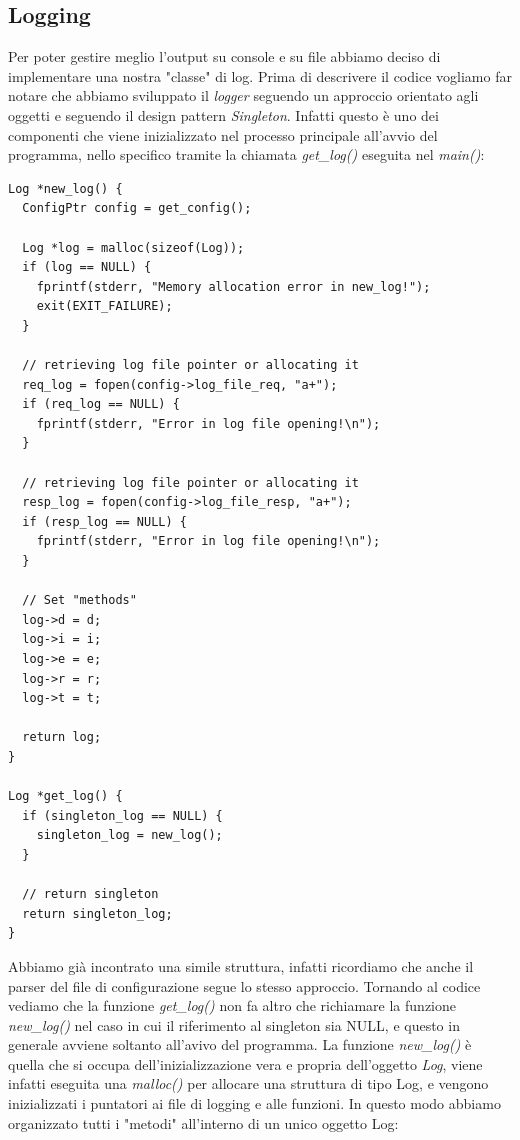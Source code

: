 \documentclass[italian]{tktltiki2}
\begin{document}
\subsection{Logging}
\label{ssec:logging}
Per poter gestire meglio l'output su console e su file abbiamo deciso di implementare una nostra "classe" di log. Prima di descrivere il codice vogliamo far notare che abbiamo sviluppato il \emph{logger} seguendo un approccio orientato agli oggetti e seguendo il design pattern \emph{Singleton}. Infatti questo è uno dei componenti che viene inizializzato nel processo principale all'avvio del programma, nello specifico tramite la chiamata \emph{get\_log()} eseguita nel \emph{main()}:
\begin{lstlisting}
Log *new_log() {
  ConfigPtr config = get_config();

  Log *log = malloc(sizeof(Log));
  if (log == NULL) {
    fprintf(stderr, "Memory allocation error in new_log!");
    exit(EXIT_FAILURE);
  }
  
  // retrieving log file pointer or allocating it
  req_log = fopen(config->log_file_req, "a+");
  if (req_log == NULL) {
    fprintf(stderr, "Error in log file opening!\n");
  }

  // retrieving log file pointer or allocating it
  resp_log = fopen(config->log_file_resp, "a+");
  if (resp_log == NULL) {
    fprintf(stderr, "Error in log file opening!\n");
  }

  // Set "methods"
  log->d = d;
  log->i = i;
  log->e = e;
  log->r = r;
  log->t = t;

  return log;
}

Log *get_log() {
  if (singleton_log == NULL) {
    singleton_log = new_log();
  }

  // return singleton
  return singleton_log;
}
\end{lstlisting}
Abbiamo già incontrato una simile struttura, infatti ricordiamo che anche il parser del file di configurazione segue lo stesso approccio. Tornando al codice vediamo che la funzione \emph{get\_log()} non fa altro che richiamare la funzione \emph{new\_log()} nel caso in cui il riferimento al singleton sia NULL, e questo in generale avviene soltanto all'avivo del programma. La funzione \emph{new\_log()} è quella che si occupa dell'inizializzazione vera e propria dell'oggetto \emph{Log}, viene infatti eseguita una \emph{malloc()} per allocare una struttura di tipo Log, e vengono inizializzati i puntatori ai file di logging e alle funzioni. In questo modo abbiamo organizzato tutti i "metodi" all'interno di un unico oggetto Log:
\end{document}
